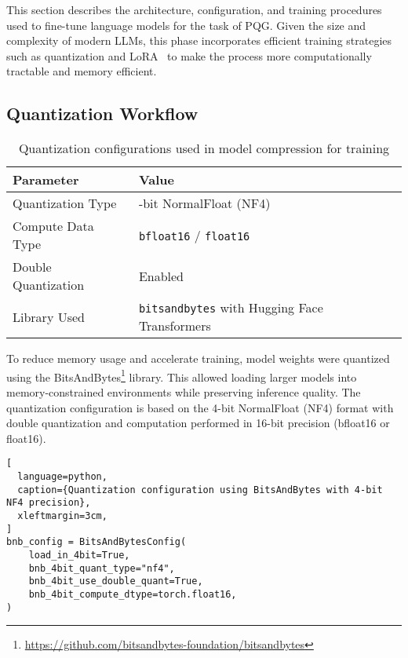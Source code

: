 This section describes the architecture, configuration, and training procedures used to
fine-tune language models for the task of PQG. Given the size and complexity of modern
LLMs, this phase incorporates efficient training strategies such as quantization and LoRA~\cite{hu2022lora} to
make the process more computationally tractable and memory efficient.

\subsection{Quantization Workflow}

\begin{table}[t]
  \centering
  \scriptsize
  \renewcommand{\arraystretch}{1.3}
  \begin{tabularx}{0.95\textwidth}{
    >{\raggedright\arraybackslash}p{5cm}
    >{\centering\arraybackslash}X
  }
    \toprule
    \textbf{Parameter} & \textbf{Value} \\
    \midrule
    Quantization Type & 4-bit NormalFloat (NF4) \\
    Compute Data Type & \texttt{bfloat16} / \texttt{float16} \\
    Double Quantization & Enabled \\
    Library Used & \texttt{bitsandbytes} with Hugging Face Transformers \\
    \bottomrule
  \end{tabularx}
  \caption{Quantization configurations used in model compression for training}
  \label{table:quant-config}
\end{table}

To reduce memory usage and accelerate training, model weights were quantized using
the BitsAndBytes\footnote{\url{https://github.com/bitsandbytes-foundation/bitsandbytes}} library. This allowed loading larger models into memory-constrained
environments while preserving inference quality. The quantization configuration is based
on the 4-bit NormalFloat (NF4) format with double quantization and computation performed
in 16-bit precision (bfloat16 or float16).

\begin{lstlisting}[
  language=python,
  caption={Quantization configuration using BitsAndBytes with 4-bit NF4 precision},
  xleftmargin=3cm,
]
bnb_config = BitsAndBytesConfig(
    load_in_4bit=True,
    bnb_4bit_quant_type="nf4",
    bnb_4bit_use_double_quant=True,
    bnb_4bit_compute_dtype=torch.float16,
)
\end{lstlisting}

